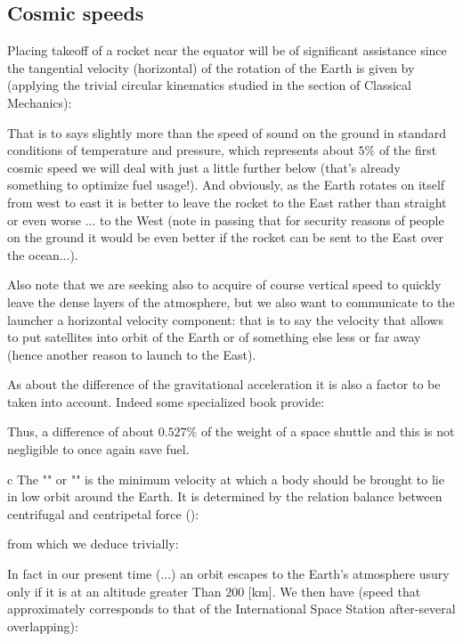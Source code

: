 	\pagebreak
	\subsection{Cosmic speeds}
	Placing takeoff of a rocket near the equator will be of significant assistance since the tangential velocity (horizontal) of the rotation of the Earth is given by (applying the trivial circular kinematics studied in the section of Classical Mechanics):
	
	That is to says slightly more than the speed of sound on the ground in standard conditions of temperature and pressure, which represents about $5\%$ of the first cosmic speed we will deal with just a little further below (that's already something to optimize fuel usage!). And obviously, as the Earth rotates on itself from west to east it is better to leave the rocket to the East rather than straight or even worse ... to the West (note in passing that for security reasons of people on the ground it would be even better if the rocket can be sent to the East over the ocean...).
	
	Also note that we are seeking also to acquire of course vertical speed to quickly leave the dense layers of the atmosphere, but we also want to communicate to the launcher a horizontal velocity component: that is to say the velocity that allows to put satellites into orbit of the Earth or of something else less or far away (hence another reason to launch to the East).
	
	As about the difference of the gravitational acceleration it is also a factor to be taken into account. Indeed some specialized book provide:
	
	Thus, a difference of about $0.527\%$ of the weight of a space shuttle and this is not negligible to once again save fuel.
	
	c
	The "" or "" is the minimum velocity at which a body should be brought to lie in low orbit around the Earth. It is determined by the relation balance between centrifugal and centripetal force ():
	
	from which we deduce trivially:
	
	In fact in our present time (...) an orbit escapes to the Earth's atmosphere usury only if it is at an altitude greater Than $200$ [km]. We then have (speed that approximately corresponds to that of the International Space Station after-several overlapping):
	
